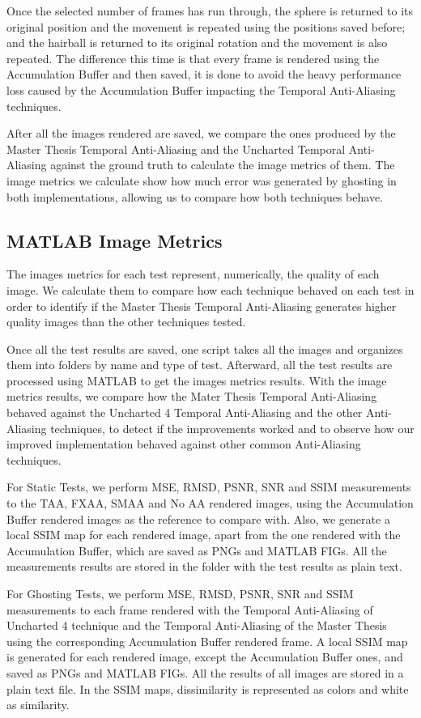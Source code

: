\documentclass{cslthse-msc}
\begin{document}
Once the selected number of frames has run through, the sphere is returned to its original position and the movement is repeated using the positions saved before; and the hairball is returned to its original rotation and the movement is also repeated. The difference this time is that every frame is rendered using the Accumulation Buffer and then saved, it is done to avoid the heavy performance loss caused by the Accumulation Buffer impacting the Temporal Anti-Aliasing techniques.

After all the images rendered are saved, we compare the ones produced by the Master Thesis Temporal Anti-Aliasing and the Uncharted Temporal Anti-Aliasing against the ground truth to calculate the image metrics of them. The image metrics we calculate show how much error was generated by ghosting in both implementations, allowing us to compare how both techniques behave. 


\subsection{MATLAB Image Metrics}
The images metrics for each test represent, numerically, the quality of each image. We calculate them to compare how each technique behaved on each test in order to identify if the Master Thesis Temporal Anti-Aliasing generates higher quality images than the other techniques tested. 

Once all the test results are saved, one script takes all the images and organizes them into folders by name and type of test. Afterward, all the test results are processed using MATLAB to get the images metrics results. With the image metrics results, we compare how the Mater Thesis Temporal Anti-Aliasing behaved against the Uncharted 4 Temporal Anti-Aliasing and the other Anti-Aliasing techniques, to detect if the improvements worked and to observe how our improved implementation behaved against other common Anti-Aliasing techniques.

For Static Tests, we perform MSE, RMSD, PSNR, SNR and SSIM measurements to the TAA, FXAA, SMAA and No AA rendered images, using the Accumulation Buffer rendered images as the reference to compare with. Also, we generate a local SSIM map for each rendered image, apart from the one rendered with the Accumulation Buffer, which are saved as PNGs and MATLAB FIGs. All the measurements results are stored in the folder with the test results as plain text. 

For Ghosting Tests, we perform MSE, RMSD, PSNR, SNR and SSIM measurements to each frame rendered with the Temporal Anti-Aliasing of Uncharted 4 technique and the Temporal Anti-Aliasing of the Master Thesis using the corresponding Accumulation Buffer rendered frame. A local SSIM map is generated for each rendered image, except the Accumulation Buffer ones, and saved as PNGs and MATLAB FIGs. All the results of all images are stored in a plain text file. In the SSIM maps, dissimilarity is represented as colors and white as similarity.
\end{document}
